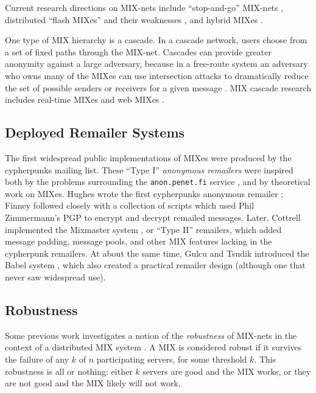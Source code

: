 \documentclass{llncs}
\begin{document}
Current research directions on MIX-nets include ``stop-and-go'' MIX-nets
\cite{kesdogan}, distributed ``flash MIXes'' \cite{flash-mix} and their
weaknesses \cite{desmedt,mitkuro}, and hybrid MIXes \cite{hybrid-mix}.

One type of MIX hierarchy is a cascade.
In a cascade network, users choose from a set of fixed paths through
the MIX-net. Cascades can provide greater anonymity against a large
adversary, because in a free-route system an
adversary who owns many of the MIXes can use intersection attacks to
dramatically reduce the set of possible senders or receivers for a given
message \cite{disad-free-routes}.
MIX cascade research includes real-time MIXes \cite{realtime-mix} and
web MIXes \cite{web-mix}.

\subsection{Deployed Remailer Systems}

The first widespread public implementations of MIXes were produced by the
cypherpunks mailing list. These ``Type I'' \emph{anonymous remailers}
were inspired both by the problems surrounding the {\tt anon.penet.fi}
service \cite{helsingius}, and by theoretical work on MIXes. Hughes wrote
the first cypherpunks anonymous remailer \cite{remailer-history}; Finney
followed closely with a collection of scripts which used Phil Zimmermann's
PGP to encrypt and decrypt remailed messages. Later, Cottrell implemented
the Mixmaster system \cite{mixmaster}, or ``Type II'' remailers, which
added message padding, message pools, and other MIX features lacking
in the cypherpunk remailers. At about the same time, Gulcu and Tsudik
introduced the Babel system \cite{babel}, which also created a practical
remailer design (although one that never saw widespread use).


\subsection{Robustness}

Some previous work investigates a notion of the \emph{robustness}
of MIX-nets in the context of a distributed MIX system
\cite{flash-mix}. A MIX is considered robust if it survives the
failure of any $k$ of $n$ participating servers, for some threshold
$k$. This robustness is all or nothing: either $k$ servers are
good and the MIX works, or they are not good and the MIX likely will
not work.
\end{document}
